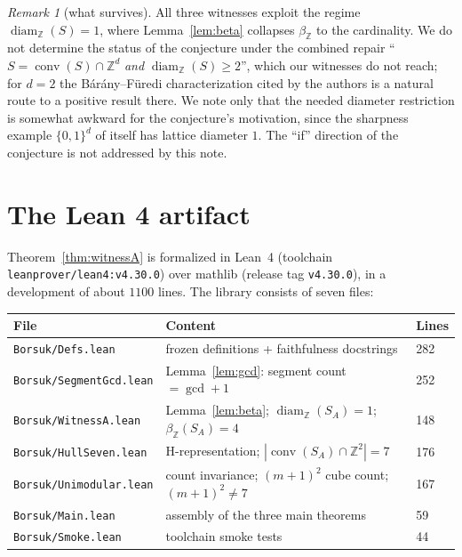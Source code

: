 \documentclass[11pt]{article}
\theoremstyle{remark}
\newtheorem{remark}[theorem]{Remark}
\newcommand{\Z}{\mathbb{Z}}
\newcommand{\conv}{\operatorname{conv}}
\newcommand{\diamZ}{\operatorname{diam}_{\Z}}
\newcommand{\betaZ}{\beta_{\Z}}
\begin{document}
\begin{remark}[what survives]\label{rem:survives}
All three witnesses exploit the regime $\diamZ(S) = 1$, where
Lemma~\ref{lem:beta} collapses $\betaZ$ to the cardinality. We do not
determine the status of the conjecture under the combined repair
``$S = \conv(S) \cap \Z^d$ \emph{and} $\diamZ(S) \ge 2$'', which our
witnesses do not reach; for $d = 2$ the B\'ar\'any--F\"uredi
characterization \cite[Theorem~2(iii)]{BaranyFuredi2001} cited by the
authors is a natural route to a positive result there. We note only that the
needed diameter restriction is somewhat awkward for the conjecture's
motivation, since the sharpness example $\{0,1\}^d$ of
\cite[Theorem~4.8]{BDLT2025} itself has lattice diameter $1$. The ``if''
direction of the conjecture is not addressed by this note.
\end{remark}

\section{The Lean 4 artifact}\label{sec:lean}

Theorem~\ref{thm:witnessA} is formalized in Lean~4 \cite{Lean4} (toolchain
\texttt{leanprover/lean4:v4.30.0}) over mathlib \cite{mathlib} (release tag
\texttt{v4.30.0}), in a development of about $1100$ lines. The library
consists of seven files:

\begin{center}\small
\begin{tabular}{@{}lll@{}}
\toprule
File & Content & Lines\\
\midrule
\texttt{Borsuk/Defs.lean} & frozen definitions + faithfulness docstrings & 282\\
\texttt{Borsuk/SegmentGcd.lean} & Lemma~\ref{lem:gcd}: segment count $= \gcd + 1$ & 252\\
\texttt{Borsuk/WitnessA.lean} & Lemma~\ref{lem:beta}; $\diamZ(S_A) = 1$; $\betaZ(S_A) = 4$ & 148\\
\texttt{Borsuk/HullSeven.lean} & H-representation; $|\conv(S_A) \cap \Z^2| = 7$ & 176\\
\texttt{Borsuk/Unimodular.lean} & count invariance; $(m+1)^2$ cube count; $(m+1)^2 \neq 7$ & 167\\
\texttt{Borsuk/Main.lean} & assembly of the three main theorems & 59\\
\texttt{Borsuk/Smoke.lean} & toolchain smoke tests & 44\\
\bottomrule
\end{tabular}
\end{center}
\end{document}
